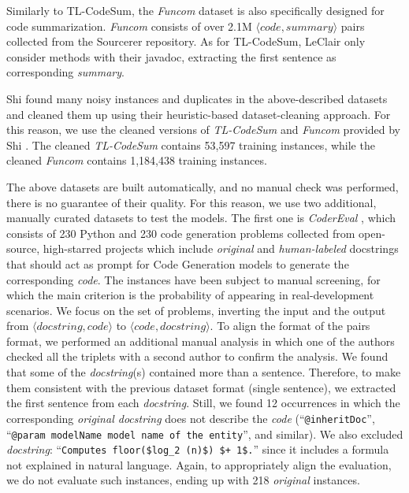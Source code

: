Similarly to TL-CodeSum, the \textit{Funcom} dataset \cite{leclair2019neural} is also specifically designed for code summarization. \textit{Funcom} consists of over 2.1M $ \langle code, summary \rangle$ pairs collected from the Sourcerer repository. As for TL-CodeSum, LeClair \etal \cite{leclair2019neural} only consider methods with their javadoc, extracting the first sentence as corresponding \textit{summary}.

Shi \etal \cite{shi2022we} found many noisy instances and duplicates in the above-described datasets and cleaned them up using their heuristic-based dataset-cleaning approach. For this reason, we use the cleaned versions of \textit{TL-CodeSum} and \textit{Funcom} provided by Shi \etal \cite{shi2022we}. The cleaned \textit{TL-CodeSum} contains 53,597 training instances, while the cleaned \textit{Funcom} contains 1,184,438 training instances.

The above datasets are built automatically, and no manual check was performed, \ie there is no guarantee of their quality. For this reason, we use two additional, manually curated datasets to test the models. The first one is \textit{CoderEval} \cite{yu2024codereval}, which consists of 230 Python and 230 \java code generation problems collected from open-source, high-starred projects which include \textit{original} and \textit{human-labeled} docstrings that should act as prompt for Code Generation models to generate the corresponding \textit{code}. 
The instances have been subject to manual screening, for which the main criterion is the probability of appearing in real-development scenarios. We focus on the \java set of problems, inverting the input and the output \ie from $\langle docstring, code \rangle$ to $\langle code, docstring \rangle$. 
To align the format of the pairs format, we performed an additional manual analysis in which one of the authors checked all the triplets with a second author to confirm the analysis. 
We found that some of the \textit{docstring}(s) contained more than a sentence. Therefore, to make them consistent with the previous dataset format (\eg single sentence), we extracted the first sentence from each \textit{docstring}. Still, we found 12 occurrences in which the corresponding \textit{original docstring} does not describe the \textit{code} (\eg ``\texttt{{@inheritDoc}}'', ``\texttt{@param modelName model name of the entity}'', and similar). We also excluded \textit{docstring}: ``\texttt{Computes floor(\$log\_2 (n)\$) \$+ 1\$.}'' since it includes a formula not explained in natural language.
Again, to appropriately align the evaluation, we do not evaluate such instances, ending up with 218 \textit{original} instances.

